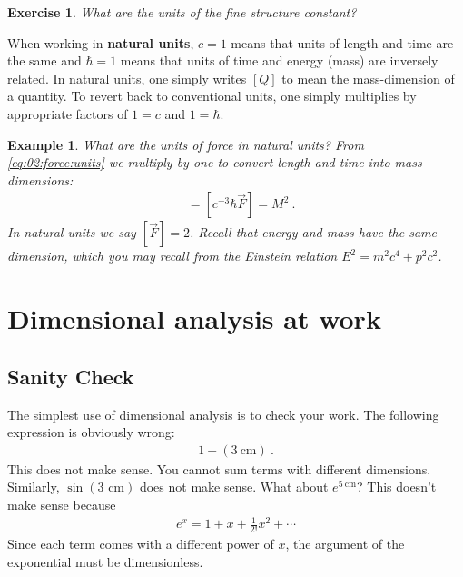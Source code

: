 \documentclass[
  11pt,
	colorful,
	raggedright,
]{tufte-style-thesis-flip}
\newtheorem{exercise}{Exercise}[section]
\newtheorem{example}{Example}[section]
\begin{document}
\begin{exercise}
What are the units of the fine structure constant?
\end{exercise}


When working in \textbf{natural units}, $c=1$ means that units of length and time are the same and $\hbar = 1$ means that units of time and energy (mass) are inversely related. In natural units, one simply writes $[Q]$ to mean the mass-dimension of a quantity. To revert back to conventional units, one simply multiplies by appropriate factors of $1=c$ and $1=\hbar$. 

\begin{example}
What are the units of force in natural units? From \eqref{eq:02:force:units} we multiply by one to convert length and time into mass dimensions:
\begin{align}
  [\vec F] &= [c^{-3} \hbar \vec{F}] = M^2 \ .
\end{align}
In natural units we say $[\vec F] = 2$. Recall that energy and mass have the same dimension, which you may recall from the Einstein relation $E^2 = m^2c^4 + p^2c^2$.
\end{example}

\section{Dimensional analysis at work}


\subsection{Sanity Check}

The simplest use of dimensional analysis is to check your work. The following expression is obviously wrong:
\begin{align}
  1 + (3~\text{cm}) \ .
\end{align}
This does not make sense. You cannot sum terms with different dimensions. Similarly, $\sin(3\text{ cm})$ does not make sense. What about $e^{5~\text{cm}}$? This doesn't make sense because
\begin{align}
  e^x = 1 + x + \frac{1}{2!} x^2 +  \cdots
\end{align}
Since each term comes with a different power of $x$, the argument of the exponential must be dimensionless. 
\end{document}
